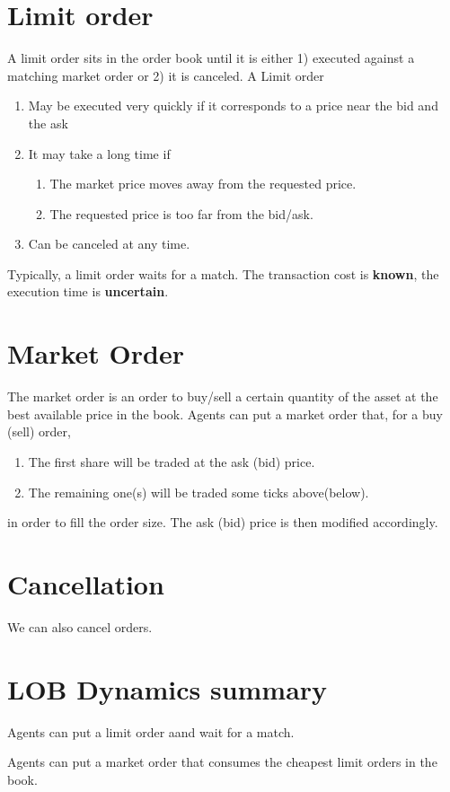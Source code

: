 \section{Limit order}
A limit order sits in the order book until it is either 
1) executed against a matching market order or 
2) it is canceled.
A Limit order
\begin{enumerate}
	\item May be executed very quickly if it corresponds to a price near the bid and the ask
	\item It may take a long time if
	\begin{enumerate}
		\item The market price moves away from the requested price.
		\item The requested price is too far from the bid/ask.
	\end{enumerate}
	\item Can be canceled at any time.
\end{enumerate}
Typically, a limit order waits for a match. The transaction cost is {\bf known}, the execution time is {\bf uncertain}.

\section{Market Order}
The market order is an order to buy/sell a certain quantity of the asset at the best available price in the book.
Agents can put a market order that, for a buy (sell) order,
\begin{enumerate}
	\item The first share will be traded at the ask (bid) price.
	\item The remaining one(s) will be traded some ticks above(below).
\end{enumerate}
in order to fill the order size. The ask (bid) price is then modified accordingly.

\section{Cancellation}
We can also cancel orders.

\section{LOB Dynamics summary}
Agents can put a limit order aand wait for a match.

Agents can put a market order that consumes the cheapest limit orders in the book.

